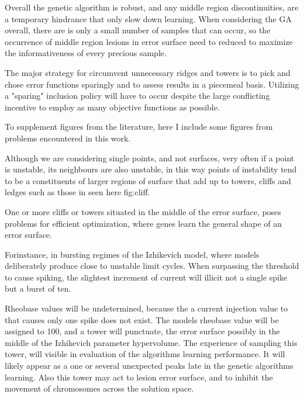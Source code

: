 Overall the genetic algorithm is robust, and any middle region discontinuities, are a temporary hindrance that only slow down learning. When considering the GA overall, there are is only a small number of samples that can occur, so the occurrence of middle region lesions in error surface need to reduced  to maximize the informativeness of every precious sample. 

The major strategy for circumvent unnecessary ridges and towers is to pick and chose error functions sparingly and to assess results in a piecemeal basis. Utilizing a "sparing" inclusion policy will have to occur despite the large conflicting incentive to employ as many objective functions as possible.



To supplement figures from the literature, here I include some figures from problems encountered in this work.

Although we are considering single points, and not surfaces, very often if a point is unstable, its neighbours are also unstable, in this way points of instability tend to be a constituents of larger regions of surface that add up to towers, cliffs and ledges such as those in seen here {fig:cliff}.

One or more cliffs or towers situated in the middle of the error surface, poses problems for efficient optimization, where genes learn the general shape of an error surface. %


Forinstance, in bursting regimes of the Izhikevich model, where models deliberately produce close to unstable limit cycles. When surpassing the threshold to cause spiking, the slightest increment of current  will illicit not a single spike but a burst of ten.

Rheobase values will be undetermined, because the a  current injection value to that causes only one spike does not exist. The models rheobase value will be assigned to 100, and a tower will punctuate, the error surface possibly in the middle of the Izhikevich parameter hypervolume. The experience of sampling this tower, will visible in evaluation of the  algorithms learning performance. It will likely appear as a one or several unexpected peaks late in the genetic algorithms learning. Also this tower may act to lesion error surface, and to inhibit the movement of chromosomes across the solution space.

